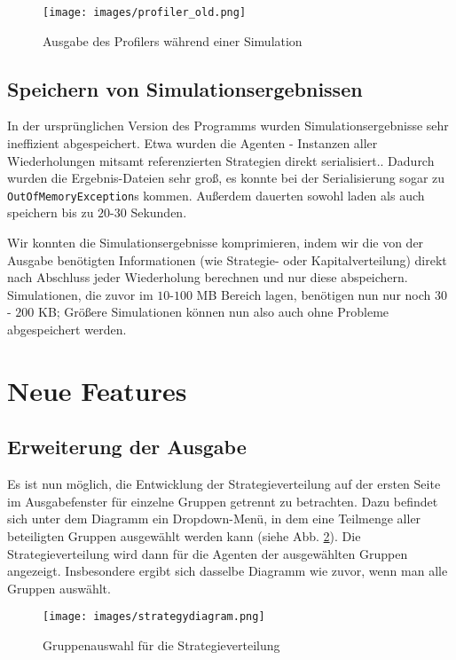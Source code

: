 \documentclass[parskip=full,11pt,openany]{scrreprt}
\begin{document}
\begin{figure}
	\centering
	\texttt{[image: images/profiler\_old.png]}
	\caption{Ausgabe des Profilers während einer Simulation}
	\label{profiler_old}
\end{figure}

\subsection{Speichern von Simulationsergebnissen}
In der ursprünglichen Version des Programms wurden Simulationsergebnisse sehr ineffizient abgespeichert. Etwa wurden die Agenten - Instanzen aller Wiederholungen mitsamt referenzierten Strategien direkt serialisiert.. Dadurch wurden die Ergebnis-Dateien sehr groß, es konnte bei der Serialisierung sogar zu \texttt{OutOfMemoryException}s kommen. Außerdem dauerten sowohl laden als auch speichern bis zu \(20\)-\(30\) Sekunden.

Wir konnten die Simulationsergebnisse komprimieren, indem wir die von der Ausgabe benötigten Informationen (wie Strategie- oder Kapitalverteilung) direkt nach Abschluss jeder Wiederholung berechnen und nur diese abspeichern. Simulationen, die zuvor im \(10\)-\(100\) MB Bereich lagen, benötigen nun nur noch \(30\) - \(200\) KB; Größere Simulationen können nun also auch ohne Probleme abgespeichert werden.

\section{Neue Features}

\subsection{Erweiterung der Ausgabe}
Es ist nun möglich, die Entwicklung der Strategieverteilung auf der ersten Seite im Ausgabefenster für einzelne Gruppen getrennt zu betrachten. Dazu befindet sich unter dem Diagramm ein Dropdown-Menü, in dem eine Teilmenge aller beteiligten Gruppen ausgewählt werden kann (siehe Abb. \ref{strategydiagram}). Die Strategieverteilung wird dann für die Agenten der ausgewählten Gruppen angezeigt. Insbesondere ergibt sich dasselbe Diagramm wie zuvor, wenn man alle Gruppen auswählt.

\begin{figure}
	\centering
	\texttt{[image: images/strategydiagram.png]}
	\caption{Gruppenauswahl für die Strategieverteilung}
	\label{strategydiagram}
\end{figure}
\end{document}
